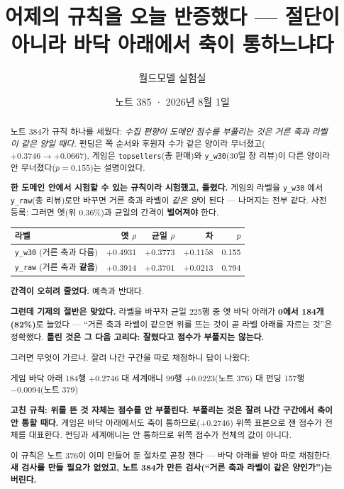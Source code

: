 \documentclass[11pt]{article}
\begin{document}
\title{어제의 규칙을 오늘 반증했다 --- 절단이 아니라 바닥 아래에서 축이 통하느냐다}
\author{월드모델 실험실}
\date{노트 385 · 2026년 8월 1일}
\maketitle

\begin{abstract}
노트 384가 규칙 하나를 세웠다: \emph{수집 편향이 도메인 점수를 부풀리는
것은 거른 축과 라벨이 같은 양일 때다.} 펀딩은 쪽 순서와 후원자 수가 같은
양이라 무너졌고($+0.3746 \to +0.0667$), 게임은 \texttt{topsellers}(총 판매)와
\texttt{y\_w30}(30일 창 리뷰)이 다른 양이라 안 무너졌다($p=0.155$)는
설명이었다.

\textbf{한 도메인 안에서 시험할 수 있는 규칙이라 시험했고, 틀렸다.}
게임의 라벨을 \texttt{y\_w30} 에서 \texttt{y\_raw}(총 리뷰)로만 바꾸면
거른 축과 라벨이 \emph{같은 양}이 된다 --- 나머지는 전부 같다. 사전 등록:
그러면 옛(위 0.36\%)과 균일의 간격이 \textbf{벌어져야} 한다.

\begin{center}
\begin{tabular}{lrrrr}
\hline
라벨 & 옛 $\rho$ & 균일 $\rho$ & 차 & $p$ \\
\hline
\texttt{y\_w30} (거른 축과 다름) & $+0.4931$ & $+0.3773$ & $+0.1158$ & 0.155 \\
\texttt{y\_raw} (거른 축과 \textbf{같음}) & $+0.3914$ & $+0.3701$ & $\mathbf{+0.0213}$ & 0.794 \\
\hline
\end{tabular}
\end{center}

\textbf{간격이 오히려 줄었다.} 예측과 반대다.

\textbf{그런데 기제의 절반은 맞았다.} 라벨을 바꾸자 균일 225행 중 옛 바닥
아래가 \textbf{0에서 184개(82\%)}로 늘었다 --- ``거른 축과 라벨이 같으면
위를 뜨는 것이 곧 라벨 아래를 자르는 것''은 정확했다. \textbf{틀린 것은
그 다음 고리다: 잘렸다고 점수가 부풀지는 않는다.}

그러면 무엇이 가르나. 잘려 나간 구간을 따로 채점하니 답이 나왔다:

\begin{center}
게임 바닥 아래 184행 $\mathbf{+0.2746}$ \quad 대 \quad
세계애니 99행 $+0.0223$(노트 376) \quad 대 \quad
펀딩 157행 $\mathbf{-0.0094}$(노트 379)
\end{center}

\textbf{고친 규칙: 위를 뜬 것 자체는 점수를 안 부풀린다. 부풀리는 것은
잘려 나간 구간에서 축이 안 통할 때다.} 게임은 바닥 아래에서도 축이
통하므로($+0.2746$) 위쪽 표본으로 잰 점수가 전체를 대표한다. 펀딩과
세계애니는 안 통하므로 위쪽 점수가 전체의 값이 아니다.

이 규칙은 노트 376이 이미 만들어 둔 절차로 곧장 잰다 --- 바닥 아래를
받아 따로 채점한다. \textbf{새 검사를 만들 필요가 없었고, 노트 384가
만든 검사(``거른 축과 라벨이 같은 양인가'')는 버린다.}
\end{abstract}
\end{document}
